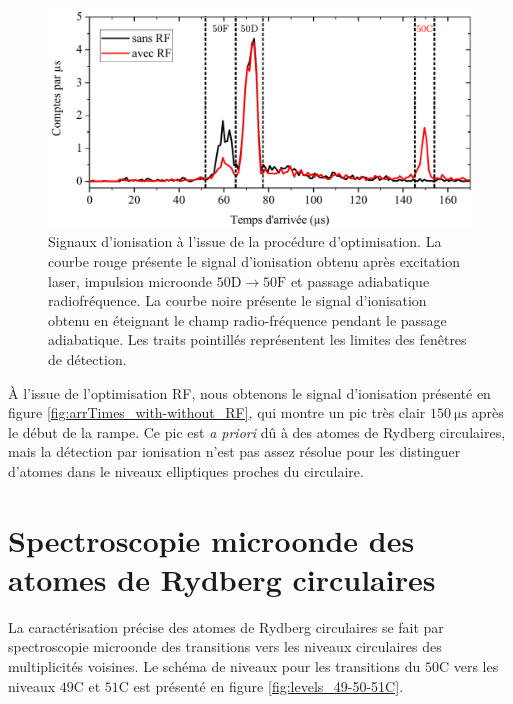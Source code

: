 %
\begin{figure}[!h]
\centering
\includegraphics[width=0.85\linewidth]{figures/circulars/arrTimes_with-without_RF}
\caption[Signaux d'ionisation des atomes circulaires]{
Signaux d'ionisation à l'issue de la procédure d'optimisation.
La courbe rouge présente le signal d'ionisation obtenu après excitation laser, impulsion microonde $\mathrm{50D \rightarrow 50F}$ et passage adiabatique radiofréquence.
La courbe noire présente le signal d'ionisation obtenu en éteignant le champ radio-fréquence pendant le passage adiabatique.
Les traits pointillés représentent les limites des fenêtres de détection.
}
\label{fig:arrTimes_with-without_RF}
\end{figure}
%
\`A l'issue de l'optimisation RF, nous obtenons le signal d'ionisation présenté en figure \eqref{fig:arrTimes_with-without_RF}, qui montre un pic très clair $\SI{150}{\us}$ après le début de la rampe.
Ce pic est \textit{a priori} dû à des atomes de Rydberg circulaires, mais la détection par ionisation n'est pas assez résolue pour les distinguer d'atomes dans le niveaux elliptiques proches du circulaire.

\clearpage
\section{Spectroscopie microonde des atomes de Rydberg circulaires}
\noindent La caractérisation précise des atomes de Rydberg circulaires se fait par spectroscopie microonde des transitions vers les niveaux circulaires des multiplicités voisines.
%
Le schéma de niveaux pour les transitions du $\mathrm{50C}$ vers les niveaux $\mathrm{49C}$ et $\mathrm{51C}$ est présenté en figure \eqref{fig:levels_49-50-51C}.

